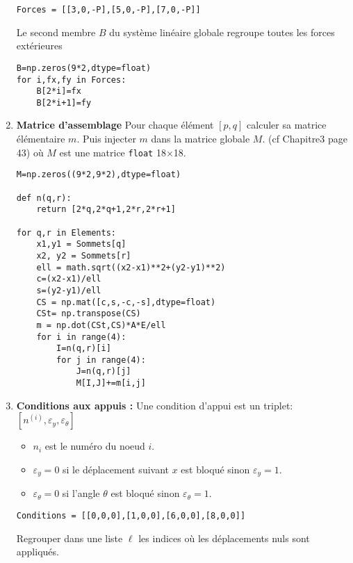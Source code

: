 \documentclass[11pt]{article}
\begin{document}
\begin{enumerate}
\begin{verbatim}
Forces = [[3,0,-P],[5,0,-P],[7,0,-P]]
\end{verbatim}
Le second membre $B$ du système linéaire globale regroupe toutes les forces extérieures 
\begin{verbatim}
B=np.zeros(9*2,dtype=float)
for i,fx,fy in Forces:
    B[2*i]=fx
    B[2*i+1]=fy
\end{verbatim}

\item {\bf Matrice d'assemblage}
Pour chaque élément $[p,q]$ calculer sa matrice élémentaire $m$. Puis injecter $m$ dans la matrice globale $M$. (cf Chapitre3 page 43) où $M$ est une matrice {\tt float} 18$\times$18.
\begin{verbatim}
M=np.zeros((9*2,9*2),dtype=float)

def n(q,r):
    return [2*q,2*q+1,2*r,2*r+1]

for q,r in Elements:
    x1,y1 = Sommets[q]
    x2, y2 = Sommets[r]
    ell = math.sqrt((x2-x1)**2+(y2-y1)**2)
    c=(x2-x1)/ell
    s=(y2-y1)/ell
    CS = np.mat([c,s,-c,-s],dtype=float)
    CSt= np.transpose(CS)
    m = np.dot(CSt,CS)*A*E/ell
    for i in range(4):
        I=n(q,r)[i]
        for j in range(4):
            J=n(q,r)[j]
            M[I,J]+=m[i,j]
\end{verbatim}


\item {\bf Conditions aux appuis :} Une condition d'appui est un triplet:
\([n^{(i)},\varepsilon_y,\varepsilon_\theta]\) 
\begin{itemize}
\item \(n_i\) est le numéro
du noeud \(i\). 
\item \(\varepsilon_y=0\) si le déplacement suivant \(x\)
est bloqué sinon \(\varepsilon_y=1\). 
\item \(\varepsilon_\theta=0\) si
l'angle \(\theta\) est bloqué sinon \(\varepsilon_\theta=1\).
\end{itemize}
\begin{verbatim}
Conditions = [[0,0,0],[1,0,0],[6,0,0],[8,0,0]]
\end{verbatim}
Regrouper dans une liste $\ell$ les indices où les déplacements nuls sont appliqués.



\end{enumerate}
\end{document}

